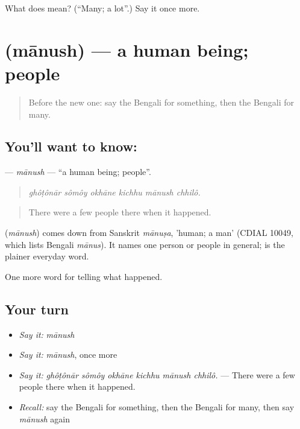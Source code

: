 \begin{tcolorbox}[breakable,colback=teal!4,colframe=teal!35!black,title={Before you move on}]
What does  mean? (\textquotedblleft{}Many; a lot\textquotedblright{}.) Say it once more.
\end{tcolorbox}
\section[\texorpdfstring{\bn{মানুষ} (mānush)}{মানুষ (mānush)}]{ (mānush) — a human being; people}

\label{lesson:BN-C276-manush}



\begin{quote}
Before the new one: say the Bengali for something, then the Bengali for many.
\end{quote}

\subsection*{You'll want to know: }
\textbf{} — \emph{mānush} — \textquotedblleft{}a human being; people\textquotedblright{}.

\begin{quote}
     
\end{quote}

\begin{quote}
\emph{ghôṭônār sômôy okhāne kichhu mānush chhilô.}
\end{quote}

\begin{quote}
There were a few people there when it happened.
\end{quote}

\begin{cousinweb}
\textbf{} (\emph{mānush}) comes down from Sanskrit \emph{mānuṣa}, 'human; a man' (CDIAL 10049, which lists Bengali \emph{mānus}). It names one person or people in general; \textbf{} is the plainer everyday word.
\end{cousinweb}

\begin{grammarlens}[title={What you've built}]
One more word for telling what happened.
\end{grammarlens}

\subsection*{Your turn}
\begin{itemize}
\raggedright
  \item \emph{Say it:} \emph{mānush}
  \item \emph{Say it:} \emph{mānush}, once more
  \item \emph{Say it:} \emph{ghôṭônār sômôy okhāne kichhu mānush chhilô.} — There were a few people there when it happened.
  \item \emph{Recall:} say the Bengali for something, then the Bengali for many, then say \emph{mānush} again
\end{itemize}

